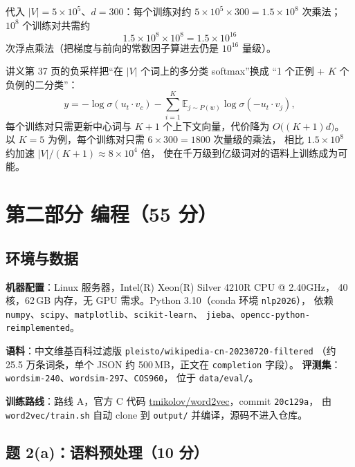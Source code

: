 \documentclass[11pt,a4paper]{article}
\begin{document}
代入 $|V|=5\times10^5$、$d=300$：每个训练对约
$5\times10^5\times300=1.5\times10^8$ 次乘法；$10^8$ 个训练对共需约
\begin{equation}
1.5\times10^8\times10^8=1.5\times10^{16}
\end{equation}
次浮点乘法（把梯度与前向的常数因子算进去仍是 $10^{16}$ 量级）。

讲义第 37 页的负采样把“在 $|V|$ 个词上的多分类 softmax”换成
“1 个正例 + $K$ 个负例的二分类”：
\begin{equation}
y=-\log\sigma(u_t\cdot v_c)-\sum_{i=1}^{K}\mathbb{E}_{j\sim P(w)}
\log\sigma(-u_t\cdot v_j),
\end{equation}
每个训练对只需更新中心词与 $K+1$ 个上下文向量，代价降为 $O\bigl((K+1)d\bigr)$。
以 $K=5$ 为例，每个训练对只需 $6\times300=1800$ 次量级的乘法，
相比 $1.5\times10^8$ 约加速 $|V|/(K+1)\approx 8\times10^4$ 倍，
使在千万级到亿级词对的语料上训练成为可能。

\section{第二部分 编程（55 分）}

\subsection{环境与数据}

\textbf{机器配置}：Linux 服务器，Intel(R) Xeon(R) Silver 4210R CPU @ 2.40GHz，
40 核，62\,GB 内存，无 GPU 需求。Python 3.10（conda 环境 \texttt{nlp2026}），
依赖 \texttt{numpy}、\texttt{scipy}、\texttt{matplotlib}、\texttt{scikit-learn}、
\texttt{jieba}、\texttt{opencc-python-reimplemented}。

\textbf{语料}：中文维基百科过滤版 \texttt{pleisto/wikipedia-cn-20230720-filtered}
（约 25.5 万条词条，单个 JSON 约 500\,MB，正文在 \texttt{completion} 字段）。
\textbf{评测集}：\texttt{wordsim-240}、\texttt{wordsim-297}、\texttt{COS960}，
位于 \texttt{data/eval/}。

\textbf{训练路线}：路线 A，官方 C 代码
\href{https://github.com/tmikolov/word2vec}{tmikolov/word2vec}，commit \texttt{20c129a}，
由 \texttt{word2vec/train.sh} 自动 clone 到 \texttt{output/} 并编译，源码不进入仓库。

\subsection{题 2(a)：语料预处理（10 分）}
\end{document}
